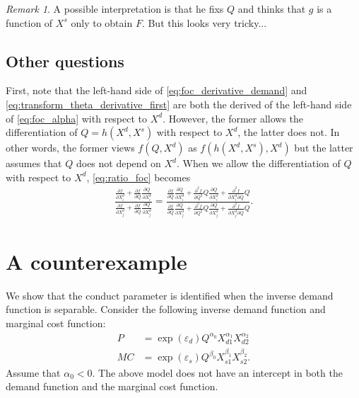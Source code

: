 \documentclass[11pt, a4paper]{article}
\theoremstyle{remark}
\newtheorem{remark}{Remark}
\begin{document}
\begin{remark}
    A possible interpretation is that he fixs $Q$ and thinks that $g$ is a function of $X^{s}$ only to obtain $F$. But this looks very tricky...
\end{remark}



\subsection{Other questions}
First, note that the left-hand side of \eqref{eq:foc_derivative_demand} and \eqref{eq:transform_theta_derivative_first} are both the derived of the left-hand side of \eqref{eq:foc_alpha} with respect to $X^{d}$.
However, the former allows the differentiation of $Q = h(X^{d}, X^{s})$ with respect to $X^{d}$, the latter does not.
In other words, the former views $f(Q, X^{d})$ as $f(h(X^{d}, X^{s}), X^{d})$ but the latter assumes that $Q$ does not depend on $X^{d}$.
When we allow the differentiation of $Q$ with respect to $X^{d}$, \eqref{eq:ratio_foc} becomes
\begin{align}
    \frac{\frac{\partial f}{\partial X^{d}_{i}} + \frac{\partial f}{\partial Q} \frac{\partial Q}{\partial X^{d}_{i}}}{\frac{\partial f}{\partial X^{d}_{j}} + \frac{\partial f}{\partial Q} \frac{\partial Q}{\partial X^{d}_{j}}} = \frac{\frac{\partial f}{\partial Q}\frac{\partial Q}{\partial X^{d}_{i}}  + \frac{\partial^2 f}{\partial Q^2}Q\frac{\partial Q}{\partial X^{d}_{i}} + \frac{\partial^2 f}{\partial X^{d}_{i}\partial Q}Q }{\frac{\partial f}{\partial Q}\frac{\partial Q}{\partial X^{d}_{j}}  + \frac{\partial^2 f}{\partial Q^2}Q\frac{\partial Q}{\partial X^{d}_{j}} + \frac{\partial^2 f}{\partial X^{d}_{j}\partial Q}Q }.
\end{align}

\section{A counterexample}

We show that the conduct parameter is identified when the inverse demand function is separable. 
Consider the following inverse demand function and marginal cost function:
\begin{align}
    P & = \exp(\varepsilon_{d}) Q^{\alpha_0} X_{d1}^{\alpha_1}X_{d2}^{\alpha_2}\label{eq:counter_demand}\\
    MC & = \exp(\varepsilon_{s})Q^{\beta_0} X_{s1}^{\beta_1} X_{s2}^{\beta_2}.\label{eq:counter_mc}
\end{align}
Assume that $\alpha_0 <0$.
The above model does not have an intercept in both the demand function and the marginal cost function. 
\end{document}
